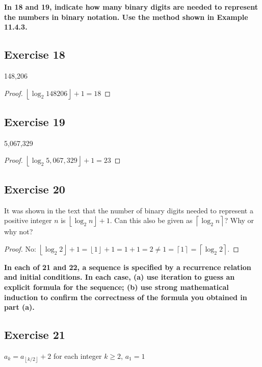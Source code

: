 \documentclass[14pt]{extarticle}
\newcommand{\cy}{\color{cyan}}
\newcommand{\floor}[1]{{\left\lfloor#1\right\rfloor}}
\newcommand{\ceil}[1]{{\left\lceil#1\right\rceil}}
\begin{document}
{\bf \cy In 18 and 19, indicate how many binary digits are needed to represent the numbers in binary notation. Use the 
method shown in Example 11.4.3.}

\subsection{Exercise 18}
148,206

\begin{proof}
\(\floor{\log_2 148206} + 1 = 18\)
\end{proof}

\subsection{Exercise 19}
5,067,329

\begin{proof}
\(\floor{\log_2 5,067,329} + 1 = 23\)
\end{proof}

\subsection{Exercise 20}
It was shown in the text that the number of binary digits needed to represent a positive integer \(n\) is 
\(\floor{\log_2 n} + 1\). Can this also be given as \(\ceil{\log_2 n}\)? Why or why not?

\begin{proof}
No: \(\floor{\log_2 2} + 1 = \floor{1} + 1 = 1 + 1 = 2 \neq 1 = \ceil{1} = \ceil{\log_2 2}\).
\end{proof}

{\bf \cy In each of 21 and 22, a sequence is specified by a recurrence relation and initial conditions. In each case, (a) 
use iteration to guess an explicit formula for the sequence; (b) use strong mathematical induction to confirm the 
correctness of the formula you obtained in part (a).}

\subsection{Exercise 21}
\(a_k = a_{\floor{k/2}} + 2\) for each integer \(k \geq 2\), \(a_1 = 1\)
\end{document}
